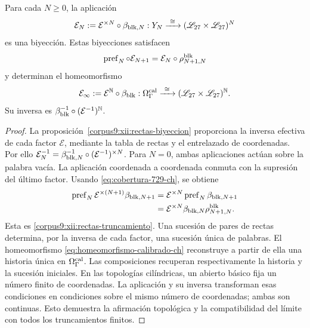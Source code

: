 \begin{theorem}
\label{corpus9:xii:rectas-homeomorfismo}
Para cada \(N\geq0\), la aplicación
\begin{equation}
 \mathcal E_N:=\mathcal E^{\times N}\circ\beta_{{\rm blk},N}:
 Y_N\xrightarrow{\ \cong\ }
 (\mathscr L_{27}\times\mathscr L_{27})^N
 \label{corpus9:xii:rectas-nivel}
\end{equation}
es una biyección. Estas biyecciones satisfacen
\begin{equation}
 \operatorname{pref}_N\circ\mathcal E_{N+1}
 =\mathcal E_N\circ\rho^{\rm blk}_{N+1,N}
 \label{corpus9:xii:rectas-truncamiento}
\end{equation}
y determinan el homeomorfismo
\begin{equation}
 \mathcal E_\infty:=\mathcal E^{\mathbb N}\circ\beta_{\rm blk}:
 \Omega_\Gamma^{\rm cal}\xrightarrow{\ \cong\ }
 (\mathscr L_{27}\times\mathscr L_{27})^{\mathbb N}.
 \label{corpus9:xii:rectas-limite}
\end{equation}
Su inversa es
\(\beta_{\rm blk}^{-1}\circ(\mathcal E^{-1})^{\mathbb N}\).
\end{theorem}
\begin{proof}
La proposición~\ref{corpus9:xii:rectas-biyeccion} proporciona la
inversa efectiva de cada factor \(\mathcal E\), mediante la tabla
de rectas y el entrelazado de coordenadas. Por ello
\(\mathcal E_N^{-1}=\beta_{{\rm blk},N}^{-1}
\circ(\mathcal E^{-1})^{\times N}\). Para \(N=0\), ambas aplicaciones
actúan sobre la palabra vacía. La aplicación coordenada a coordenada
conmuta con la supresión del último factor. Usando
\eqref{eq:cobertura-729-ch}, se obtiene
\[
 \begin{aligned}
 \operatorname{pref}_N\mathcal E^{\times(N+1)}
           \beta_{{\rm blk},N+1}
 &=\mathcal E^{\times N}\operatorname{pref}_N
           \beta_{{\rm blk},N+1}\\
 &=\mathcal E^{\times N}\beta_{{\rm blk},N}
           \rho^{\rm blk}_{N+1,N}.
 \end{aligned}
\]
Esta es \eqref{corpus9:xii:rectas-truncamiento}. Una sucesión de pares
de rectas determina, por la inversa de cada factor, una sucesión única
de palabras. El homeomorfismo
\eqref{eq:homeomorfismo-calibrado-ch} reconstruye a partir de ella una
historia única en \(\Omega_\Gamma^{\rm cal}\). Las composiciones
recuperan respectivamente la historia y la sucesión iniciales.
En las topologías cilíndricas, un abierto básico fija un número finito
de coordenadas. La aplicación y su inversa transforman esas condiciones
en condiciones sobre el mismo número de coordenadas; ambas son
continuas. Esto demuestra la afirmación topológica y la compatibilidad
del límite con todos los truncamientos finitos.
\end{proof}

